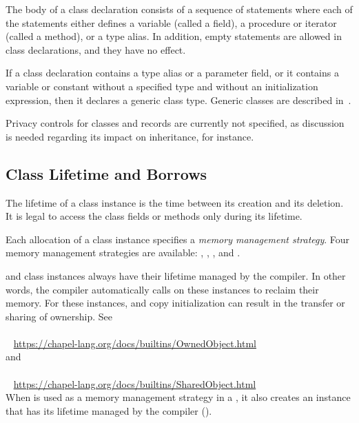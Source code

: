 The body of a class declaration consists of a sequence of statements
where each of the statements either defines a variable (called a
field), a procedure or iterator (called a method), or a type alias.  In addition, empty
statements are allowed in class declarations, and they have no effect.

If a class declaration contains a type alias or a parameter field, or it contains a variable or
constant without a specified type and without an initialization
expression, then it declares a generic class type.  Generic classes are described
in~.

\begin{future}
Privacy controls for classes and records are currently not specified,
as discussion is needed regarding its impact on inheritance, for
instance.
\end{future}

\subsection{Class Lifetime and Borrows}
\label{Class_Lifetime_and_Borrows}

The lifetime of a class instance is the time between its creation and its
deletion. It is legal to access the class fields or methods only during
its lifetime.

Each allocation of a class instance specifies a
\emph{memory management strategy}.
Four memory management strategies are available:
, , , and .

 and  class instances always have their lifetime
managed by the compiler. In other words, the compiler automatically
calls  on these instances to reclaim their memory. For these
instances, \chpl{=} and copy initialization can result in the transfer or
sharing of ownership. See
\\ %
\mbox{$$ $$ $$ $$ $$} %
\url{https://chapel-lang.org/docs/builtins/OwnedObject.html}
\\
and
\\ %
\mbox{$$ $$ $$ $$ $$} %
\url{https://chapel-lang.org/docs/builtins/SharedObject.html}
\\

When  is used as a memory management strategy in a
, it also creates an instance that has its lifetime
managed by the compiler ().

